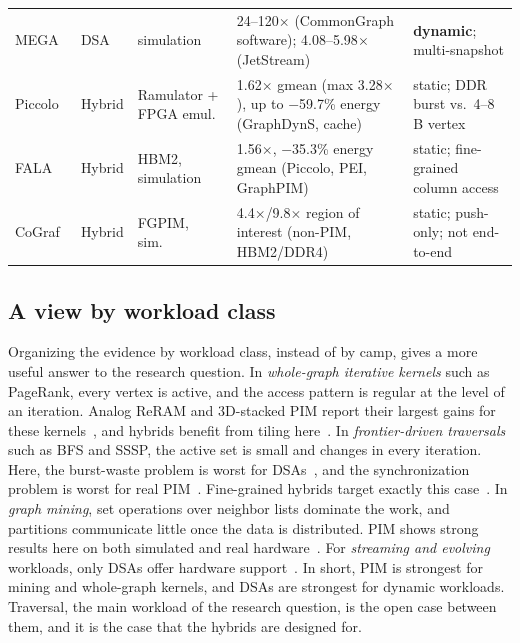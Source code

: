 \documentclass[journal,onecolumn]{IEEEtran}
\begin{document}
\begin{table}[t]
\begin{tabularx}{\textwidth}{@{}L{2.3cm}L{1.1cm}L{3.0cm}YL{4.0cm}@{}}
MEGA~\cite{gao2023mega} & DSA & simulation & 24--120$\times$ (CommonGraph software); 4.08--5.98$\times$ (JetStream) & \textbf{dynamic}; multi-snapshot \\
Piccolo~\cite{shin2025piccolo} & Hybrid & Ramulator + FPGA emul.\ & 1.62$\times$ gmean (max 3.28$\times$), up to $-$59.7\% energy (GraphDynS, cache) & static; DDR burst vs.\ 4--8\,B vertex \\
FALA~\cite{shin2025fala} & Hybrid & HBM2, simulation & 1.56$\times$, $-$35.3\% energy gmean (Piccolo, PEI, GraphPIM) & static; fine-grained column access \\
CoGraf~\cite{yenimol2026cograf} & Hybrid & FGPIM, sim.\ & 4.4$\times$/9.8$\times$ region of interest (non-PIM, HBM2/DDR4) & static; push-only; not end-to-end \\
\bottomrule
\end{tabularx}
\end{table}

\subsection{A view by workload class}
Organizing the evidence by workload class, instead of by camp, gives a more useful answer to the research question. In \emph{whole-graph iterative kernels} such as PageRank, every vertex is active, and the access pattern is regular at the level of an iteration. Analog ReRAM and 3D-stacked PIM report their largest gains for these kernels~\cite{song2018graphr,challapalle2020gaasx,ahn2015tesseract}, and hybrids benefit from tiling here~\cite{shin2025piccolo}. In \emph{frontier-driven traversals} such as BFS and SSSP, the active set is small and changes in every iteration. Here, the burst-waste problem is worst for DSAs~\cite{shin2025piccolo}, and the synchronization problem is worst for real PIM~\cite{gomezluna2022prim,barkhordar2025alphapim}. Fine-grained hybrids target exactly this case~\cite{shin2025fala,yenimol2026cograf}. In \emph{graph mining}, set operations over neighbor lists dominate the work, and partitions communicate little once the data is distributed. PIM shows strong results here on both simulated and real hardware~\cite{besta2021sisa,talati2022ndminer,cai2024pimpam}. For \emph{streaming and evolving} workloads, only DSAs offer hardware support~\cite{rahman2021jetstream,zhao2022tdgraph,gao2023mega}. In short, PIM is strongest for mining and whole-graph kernels, and DSAs are strongest for dynamic workloads. Traversal, the main workload of the research question, is the open case between them, and it is the case that the hybrids are designed for.
\end{document}
